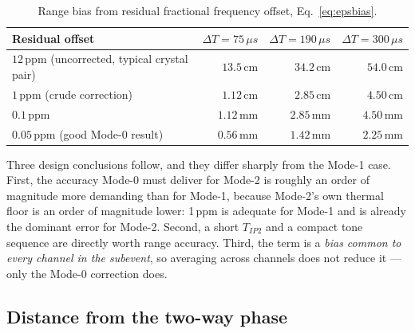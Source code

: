 \documentclass[11pt,a4paper]{article}
\newcommand{\us}{\,\ensuremath{\upmu}s}
\newcommand{\Tipp}{T_{IP2}}
\providecommand{\upmu}{\mu}
\begin{document}
\begin{table}[h]
\caption{Range bias from residual fractional frequency offset, Eq.~\eqref{eq:epsbias}.}
\label{tab:epsbias}
\centering\small
\begin{tabular}{@{}lrrr@{}}
\toprule
Residual offset & $\Delta T=75\us$ & $\Delta T=190\us$ & $\Delta T=300\us$ \\
\midrule
$12$\,ppm (uncorrected, typical crystal pair) & $13.5$\,cm & $34.2$\,cm & $54.0$\,cm \\
$1$\,ppm (crude correction)   & $1.12$\,cm & $2.85$\,cm & $4.50$\,cm \\
$0.1$\,ppm                    & $1.12$\,mm & $2.85$\,mm & $4.50$\,mm \\
$0.05$\,ppm (good Mode-0 result) & $0.56$\,mm & $1.42$\,mm & $2.25$\,mm \\
\bottomrule
\end{tabular}
\end{table}

Three design conclusions follow, and they differ sharply from the Mode-1 case. First, the accuracy
Mode-0 must deliver for Mode-2 is roughly an order of magnitude more demanding than for Mode-1,
because Mode-2's own thermal floor is an order of magnitude lower: 1\,ppm is adequate for Mode-1 and
is already the dominant error for Mode-2. Second, a short $\Tipp$ and a compact tone sequence are
directly worth range accuracy. Third, the term is a \emph{bias common to every channel in the
subevent}, so averaging across channels does not reduce it --- only the Mode-0 correction does.

\subsection{Distance from the two-way phase}
\end{document}
